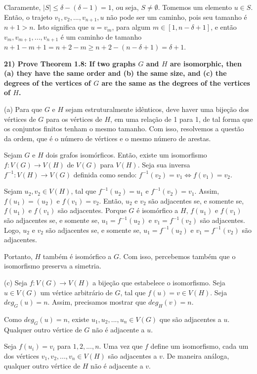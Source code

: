 \documentclass[]{article}
\begin{document}
Claramente, $|S| \leq \delta-(\delta-1)=1$, ou seja, $S \neq \emptyset$. Tomemos um elemento $u \in S$. Então, o trajeto $v_1, v_2, ..., v_{n+1}, u$ não pode ser um caminho, pois seu tamanho é $n+1 > n$. Isto significa que $u = v_m$, para algum $m \in [1, n-\delta+1]$, e então $v_m, v_{m+1}, ..., v_{n+1}$ é um caminho de tamanho $n+1-m+1 = n+2-m \geq n+2-(n-\delta+1)=\delta+1$.

\newpage

\noindent \textbf{21) Prove Theorem 1.8: If two graphs $G$ and $H$ are isomorphic, then (a) they have the same order and (b) the same size, and (c) the degrees of the vertices of $G$ are the same as the degrees of the vertices of $H$.
}

(a) Para que $G$ e $H$ sejam estruturalmente idênticos, deve haver uma bijeção dos vértices de $G$ para os vértices de $H$, em uma relação de 1 para 1, de tal forma que os conjuntos finitos tenham o mesmo tamanho. Com isso, resolvemos a questão da ordem, que é o número de vértices e o mesmo número de arestas.

Sejam $G$ e $H$ dois grafos isomórficos. Então, existe um isomorfismo $f: V(G) \rightarrow V(H)$ de $V(G)$ para $V(H)$. Seja sua inversa $f^{-1}: V(H) \rightarrow V(G)$ definida como sendo: $f^{-1}(v_2) = v_1 \iff f(v_1) = v_2$.

Sejam $u_2, v_2 \in V(H)$, tal que $f^{-1}(u_2) = u_1$ e $f^{-1}(v_2) = v_1$. Assim, $f(u_1) = (u_2)$ e $f(v_1) = v_2$. Então, $u_2$ e $v_2$ são adjacentes se, e somente se, $f(u_1)$ e $f(v_1)$ são adjacentes. Porque $G$ é isomórfico a $H$, $f(u_1)$ e $f(v_1)$ são adjacentes se, e somente se, $u_1 = f^{-1}(u_2)$ e $v_1 = f^{-1}(v_2)$ são adjacentes. Logo, $u_2$ e $v_2$ são adjacentes se, e somente se, $u_1 = f^{-1}(u_2)$ e $v_1 = f^{-1}(v_2)$ são adjacentes.

Portanto, $H$ também é isomórfico a $G$. Com isso, percebemos também que o isomorfismo preserva a simetria.

(c) Seja $f: V(G) \rightarrow V(H)$ a bijeção que estabelece o isomorfismo. Seja $u \in V(G)$ um vértice arbitrário de $G$, tal que $f(u) = v \in V(H)$. Seja $deg_G(u) = n$. Assim, precisamos mostrar que $deg_H(v) = n$.

Como $deg_G(u) = n$, existe $u_1, u_2, ..., u_n \in V(G)$ que são adjacentes a $u$. Qualquer outro vértice de $G$ não é adjacente a $u$.

Seja $f(u_i) = v_i$ para $1, 2, ..., n$. Uma vez que $f$ define um isomorfismo, cada um dos vértices $v_1, v_2, ..., v_n \in V(H)$ são adjacentes a $v$. De maneira análoga, qualquer outro vértice de $H$ não é adjacente a $v$.
\end{document}
